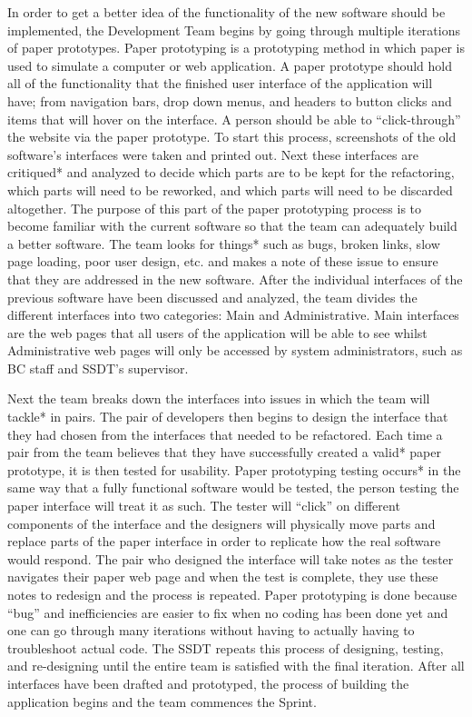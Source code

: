 In order to get a better idea of the functionality of the new software should be implemented, the Development Team begins by going through multiple iterations of paper prototypes. Paper prototyping is a prototyping method in which paper is used to simulate a computer or web application. A paper prototype should hold all of the functionality that the finished user interface of the application will have; from navigation bars, drop down menus, and headers to button clicks and items that will hover on the interface. A person should be able to ``click-through'' the website via the paper prototype. To start this process, screenshots of the old software's interfaces were taken and printed out. Next these interfaces are critiqued* and analyzed to decide which parts are to be kept for the refactoring, which parts will need to be reworked, and which parts will need to be discarded altogether. The purpose of this part of the paper prototyping process is to become familiar with the current software so that the team can adequately build a better software. The team looks for things* such as bugs, broken links, slow page loading, poor user design, etc. and makes a note of these issue to ensure that they are addressed in the new software. After the individual interfaces of the previous software have been discussed and analyzed, the team divides the different interfaces into two categories: Main and Administrative. Main interfaces are the web pages that all users of the application will be able to see whilst Administrative web pages will only be accessed by system administrators, such as BC staff and SSDT's supervisor.

Next the team breaks down the interfaces into issues in which the team will tackle* in pairs. The pair of developers then begins to design the interface that they had chosen from the interfaces that needed to be refactored. Each time a pair from the team believes that they have successfully created a valid* paper prototype, it is then tested for usability. Paper prototyping testing occurs* in the same way that a fully functional software would be tested, the person testing the paper interface will treat it as such. The tester will ``click'' on different components of the interface and the designers will physically move parts and replace parts of the paper interface in order to replicate how the real software would respond. The pair who designed the interface will take notes as the tester navigates their paper web page and when the test is complete, they use these notes to redesign and the process is repeated. Paper prototyping is done because ``bug'' and inefficiencies are easier to fix when no coding has been done yet and one can go through many iterations without having to actually having to troubleshoot actual code. The SSDT repeats this process of designing, testing, and re-designing until the entire team is satisfied with the final iteration. After all interfaces have been drafted and prototyped, the process of building the application begins and the team commences the Sprint.

